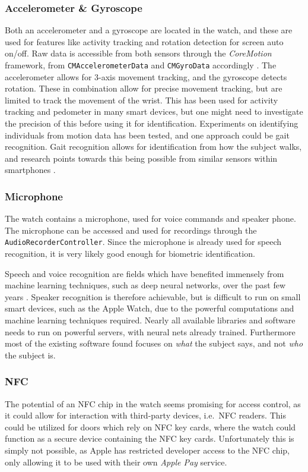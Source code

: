 \subsubsection{Accelerometer \& Gyroscope}
Both an accelerometer and a gyroscope are located in the watch, and these are
used for features like activity tracking and rotation detection for screen
auto on/off. Raw data is accessible from both sensors through the
\textit{CoreMotion} framework, from \texttt{CMAccelerometerData} and
\texttt{CMGyroData} accordingly \cite{coremotionfw}. The accelerometer allows
for 3-axis movement tracking, and the gyroscope detects rotation. These in
combination allow for precise movement tracking, but are limited to track the
movement of the wrist. This has been used for activity tracking and pedometer 
in many smart devices, but one might need to investigate the precision of this
before using it for identification. 
Experiments on identifying individuals from motion data has been tested, and
one approach could be gait recognition. Gait recognition allows for
identification from how the subject walks, and research points towards this
being possible from similar sensors within smartphones \cite{7181946}. 

\subsubsection{Microphone}
The watch contains a microphone, used for voice commands and speaker phone. The
microphone can be accessed and used for recordings through the
\texttt{AudioRecorderController}. Since the microphone is already used for
speech recognition, it is very likely good enough for biometric identification. 

Speech and voice recognition are fields which have benefited immensely from 
machine learning techniques, such as deep neural networks, over the past few 
years \cite{6296526}. Speaker recognition is therefore achievable, but is 
difficult to run on small smart devices, such as the Apple Watch, due to the 
powerful computations and machine learning techniques required. Nearly all 
available libraries and software needs to run on powerful servers, with neural
nets already trained. 
Furthermore most of the existing software found focuses on \textit{what} the 
subject says, and not \textit{who} the subject is.

\subsubsection{NFC}
The potential of an NFC chip in the watch seems promising for access control, as
it could allow for interaction with third-party devices, i.e.\ NFC readers. This
could be utilized for doors which rely on NFC key cards, where the watch could
function as a secure device containing the NFC key cards. 
Unfortunately this is simply not possible, as Apple has restricted developer 
access to the NFC chip, only allowing it to be used with their own \textit{Apple
    Pay} service. 

